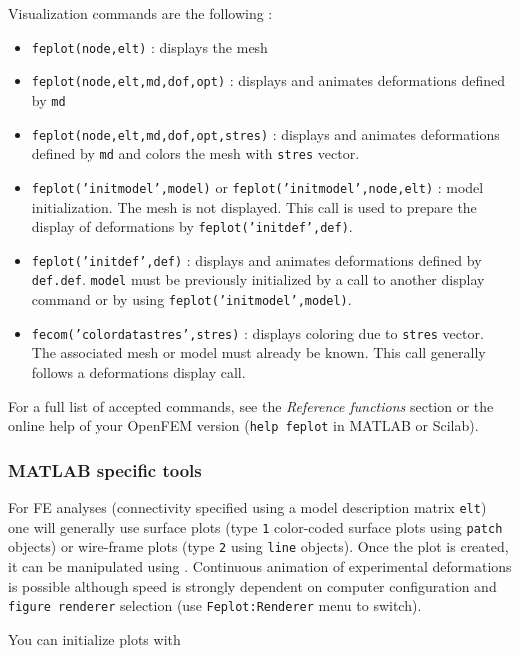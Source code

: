 Visualization commands are the following :
\begin{itemize}
\item {\tt feplot(node,elt)} : displays the mesh 
\item {\tt feplot(node,elt,md,dof,opt)} : displays and animates deformations defined by \verb+md+
\item {\tt feplot(node,elt,md,dof,opt,stres)} : displays and animates deformations defined by \verb+md+ and colors the mesh with \verb+stres+ vector.
\item {\tt feplot('initmodel',model)} or {\tt feplot('initmodel',node,elt)} : model initialization. The mesh is not displayed. This call is used to prepare the display of deformations by {\tt feplot('initdef',def)}.
\item {\tt feplot('initdef',def)} : displays and animates deformations defined by \verb+def.def+. \verb+model+ must be previously initialized by a call to another display command or by using {\tt feplot('initmodel',model)}.
\item {\tt fecom('colordatastres',stres)} : displays coloring due to \verb+stres+ vector. The associated mesh or model must already be known. This call generally follows a deformations display call.
\end{itemize}

For a full list of accepted commands, see the {\sl Reference functions} section or the online help of your OpenFEM version ({\tt help feplot} in MATLAB or Scilab).

\newpage
\subsubsection{MATLAB specific tools \label{visumat}}

For FE analyses (connectivity specified using a model description matrix {\tt elt}) one will generally use surface plots (type {\tt 1} color-coded surface plots using {\tt patch} objects) or wire-frame plots (type {\tt 2} using {\tt line} objects).  Once the plot is created, it can be manipulated using \fecom.  Continuous animation of experimental deformations is possible although speed is strongly dependent on computer configuration and {\tt figure renderer} selection (use {\tt Feplot:Renderer} menu to switch).



You can initialize plots with

